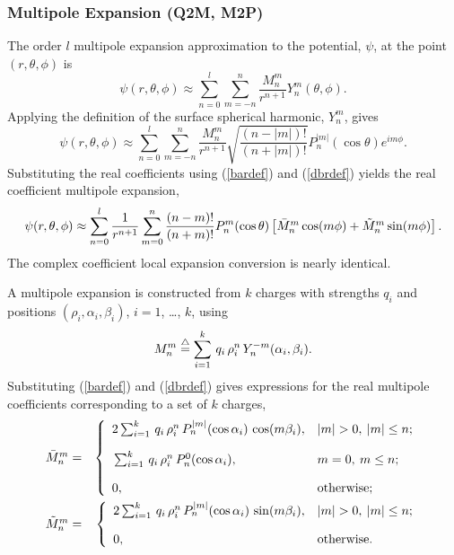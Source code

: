 \subsubsection{Multipole Expansion (Q2M, M2P)}

The order $l$ multipole expansion approximation to the potential, $\psi$,
at the point
$(r, \theta, \phi)$ 
is
\begin{equation}
\psi(r, \theta, \phi)\approx \sum_{n=0}^{l}\sum_{m=-n}^{n}\frac{M_n^m}{r^{n+1}}Y_n^m(\theta, \phi).
\end{equation}
Applying the definition of the surface spherical harmonic,
$Y_n^m$,
gives
\begin{equation}
\psi(r, \theta, \phi)\approx\sum_{n=0}^{l}\sum_{m=-n}^{n}\frac{M_n^m}{r^{n+1}}\sqrt{\frac{(n-|m|)!}{(n+|m|)!}}P_n^{|m|}(\cos\theta)e^{im\phi}.
\end{equation}
Substituting the real coefficients using (\ref{bardef}) and (\ref{dbrdef}) 
yields
the real coefficient multipole expansion,
\begin{equation}
\psi(r, \theta, \phi) \approx \sum_{n=0}^{l}\frac{1}{r^{n+1}}\sum_{m=0}^n
\frac{(n-m)!}{(n+m)!}P_n^m(\cos\theta)
\left[\mbox{$\bar{M}_{n}^{m}$}\cos(m\phi)+\mbox{$\tilde{M}_{n}^{m}$}\sin(m\phi)\right].
\label{remult}
\end{equation}
The complex coefficient local expansion conversion is nearly identical.

A multipole expansion is constructed from
$k$ charges with strengths $q_i$ and positions
$(\rho_i, \alpha_i, \beta_i)$, $i=1$, \ldots, $k$, using
\begin{equation}
M_n^m \stackrel{\triangle}{=} \sum_{i=1}^{k}\, q_i\, \rho_i^n\, Y_n^{-m}(\alpha_i, \beta_i).
\end{equation}
Substituting (\ref{bardef}) and (\ref{dbrdef}) gives expressions for
the real multipole coefficients corresponding to a set of $k$ charges,
\begin{eqnarray}
\Mb{n}{m} &=& \left\{
\begin{array}{ll}
\rule[-5mm]{0mm}{5mm}2\sum_{i=1}^{k}\, q_i\, \rho_i^n\, P_n^{|m|}(\cos\alpha_i)\, \cos(m\beta_i), & |m|>0,\: |m|\leq n;\\
\rule[-5mm]{0mm}{5mm}\sum_{i=1}^{k}\, q_i\, \rho_i^n\, P_n^{0}(\cos\alpha_i), & m=0,\: m\leq n;\\
0, &\mbox{otherwise;}
\end{array}
\right.\label{barmul}\\
\Mbb{n}{m} &=& \left\{
\begin{array}{ll}
\rule[-5mm]{0mm}{5mm}2\sum_{i=1}^{k}\, q_i\, \rho_i^n\, P_n^{|m|}(\cos\alpha_i)\, \sin(m\beta_i), & |m|>0,\: |m|\leq n;\\
0, & \mbox{otherwise.}
\end{array}
\right.\label{dbrmul}
\end{eqnarray}


